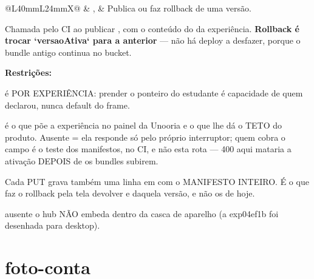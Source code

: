 \begin{tabularx}{\linewidth}{@{}L{40mm}L{24mm}X@{}}
 & ,  & Publica ou faz rollback de uma versão.\par Chamada pelo CI ao publicar , com o conteúdo do  da experiência. \textbf{Rollback é trocar `versaoAtiva` para a anterior} --- não há deploy a desfazer, porque o bundle antigo continua no bucket.\par \textbf{Restrições:}\par \hspace*{1em}\textbullet{}  é POR EXPERIÊNCIA: prender o ponteiro do estudante é capacidade de quem declarou, nunca default do frame.\par \hspace*{1em}\textbullet{}  é o que põe a experiência no painel da Unooria  e o que lhe dá o TETO do produto. Ausente = ela responde só pelo próprio interruptor; quem cobra o campo é o teste dos manifestos, no CI, e não esta rota --- 400 aqui mataria a ativação DEPOIS de os bundles subirem.\par \hspace*{1em}\textbullet{} Cada PUT grava também uma linha em  com o MANIFESTO INTEIRO. É o que faz o rollback pela tela devolver  e  daquela versão, e não os de hoje.\par \hspace*{1em}\textbullet{}  ausente \implica{} o hub NÃO embeda dentro da casca de aparelho (a exp04ef1b foi desenhada para desktop).\\
\bottomrule
\end{tabularx}

\section{foto-conta}

